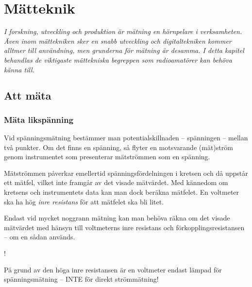 \chapter{Mätteknik}

\emph{I forskning, utveckling och produktion är mätning en hörnpelare
  i verksamheten. Även inom mättekniken sker en snabb utveckling och
  digitaltekniken kommer alltmer till användning, men grunderna för
  mätning är desamma. I detta kapitel behandlas de viktigaste
  mättekniska begreppen som radioamatörer kan behöva känna till.}

\section{Att mäta}

\subsection{Mäta likspänning}
\label{mäta_likspänning}

Vid spänningsmätning bestämmer man potentialskillnaden -- spänningen --
mellan två punkter.
Om det finns en spänning, så flyter en motsvarande (mät)ström genom
instrumentet som presenterar mätströmmen som en spänning.

Mätströmmen påverkar emellertid spänningsfördelningen i kretsen och då
uppstår ett mätfel, vilket inte framgår av det visade mätvärdet.
Med kännedom om kretsens och instrumentets data kan man dock beräkna mätfelet.
En voltmeter ska ha hög \emph{inre resistans} för att mätfelet ska bli litet.

Endast vid mycket noggrann mätning kan man behöva räkna om det visade
mätvärdet med hänsyn till voltmeterns inre resistans och
förkopplingsresistansen -- om en sådan används.

\begin{center}
\begin{minipage}{0.19\columnwidth}
  \Huge{\hspace{1ex}!}
\end{minipage}
\begin{minipage}{0.7\columnwidth}
På grund av den höga inre resistansen är en voltmeter endast lämpad
för spänningsmätning -- INTE för direkt strömmätning!
\end{minipage}
\end{center}


